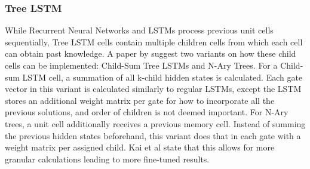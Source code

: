 \subsubsection{Tree LSTM}
While Recurrent Neural Networks and LSTMs process previous unit cells
sequentially, Tree LSTM cells \cite{DBLP:journals/corr/TaiSM15}
\cite{DBLP:journals/corr/ZhuSG15} \cite{DBLP:journals/corr/LeZ15} contain
multiple children cells from which each cell can obtain past knowledge. A paper
by \cite{tai2015improved} suggest two variants on how these child cells can be implemented:
Child-Sum Tree LSTMs and N-Ary Trees. For a Child-sum LSTM cell, a summation of
all k-child hidden states is calculated. Each gate vector in this variant is
calculated similarly to regular LSTMs, except the LSTM stores an additional
weight matrix per gate for how to incorporate all the previous solutions, and
order of children is not deemed important. For N-Ary trees, a unit cell
additionally receives a previous memory cell. Instead of summing the previous
hidden states beforehand, this variant does that in each gate with a weight
matrix per assigned child. Kai et al state that this allows for more granular
calculations leading to more fine-tuned results.
